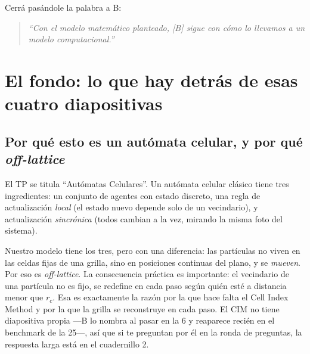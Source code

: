 \documentclass[11pt]{article}
\begin{document}

Cerrá pasándole la palabra a B:

\begin{quote}
\itshape
``Con el modelo matemático planteado, [B] sigue con cómo lo llevamos a un
modelo computacional.''
\end{quote}

\section{El fondo: lo que hay detrás de esas cuatro diapositivas}

\subsection{Por qué esto es un autómata celular, y por qué \textit{off-lattice}}

El TP se titula ``Autómatas Celulares''. Un autómata celular clásico tiene tres
ingredientes: un conjunto de agentes con estado discreto, una regla de
actualización \emph{local} (el estado nuevo depende solo de un vecindario), y
actualización \emph{sincrónica} (todos cambian a la vez, mirando la misma foto
del sistema).

Nuestro modelo tiene los tres, pero con una diferencia: las partículas no viven
en las celdas fijas de una grilla, sino en posiciones continuas del plano, y se
\emph{mueven}. Por eso es \textit{off-lattice}. La consecuencia práctica es
importante: el vecindario de una partícula no es fijo, se redefine en cada paso
según quién esté a distancia menor que $r_c$. Esa es exactamente la razón por la
que hace falta el Cell Index Method y por la que la grilla se reconstruye en
cada paso. El CIM no tiene diapositiva propia ---B lo nombra al pasar en la 6 y
reaparece recién en el benchmark de la 25---, así que si te preguntan por él en
la ronda de preguntas, la respuesta larga está en el cuadernillo 2.

\end{document}
